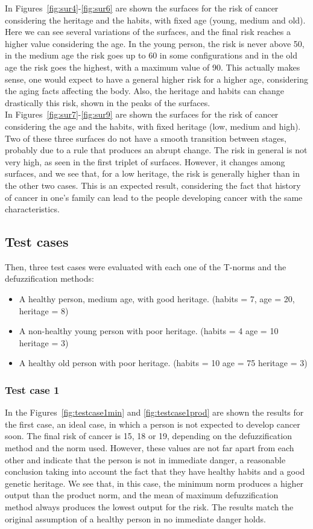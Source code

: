 \documentclass[conference]{IEEEtran}
\begin{document}
In Figures~\ref{fig:sur4}-\ref{fig:sur6} are shown the surfaces for the risk of cancer considering the heritage and the habits, with fixed age (young, medium and old). Here we can see several variations of the surfaces, and the final risk reaches a higher value considering the age. In the young person, the risk is never above 50, in the medium age the risk goes up to 60 in some configurations and in the old age the risk goes the highest, with a maximum value of 90. This actually makes sense, one would expect to have a general higher risk for a higher age, considering the aging facts affecting the body. Also, the heritage and habits can change drastically this risk, shown in the peaks of the surfaces.\\

In Figures~\ref{fig:sur7}-\ref{fig:sur9} are shown the surfaces for the risk of cancer considering the age and the habits, with fixed heritage (low, medium and high). Two of these three surfaces do not have a smooth transition between stages, probably due to a rule that produces an abrupt change. The risk in general is not very high, as seen in the first triplet of surfaces. However, it changes among surfaces, and we see that, for a low heritage, the risk is generally higher than in the other two cases. This is an expected result, considering the fact that history of cancer in one's family can lead to the people developing cancer with the same characteristics.

\subsection{Test cases}
Then, three test cases were evaluated with each one of the T-norms and the defuzzification methods:
\begin{itemize}
    \item A healthy person, medium age, with good heritage. (habits = 7, age = 20, heritage = 8)
    \item A non-healthy young person with poor heritage. (habits = 4 age = 10 heritage = 3)
    \item A healthy old person with poor heritage. (habits = 10 age = 75 heritage = 3)
\end{itemize}

\subsubsection{Test case 1}
In the Figures~\ref{fig:testcase1min} and \ref{fig:testcase1prod} are shown the results for the first case, an ideal case, in which a person is not expected to develop cancer soon. The final risk of cancer is 15, 18 or 19, depending on the defuzzification method and the norm used. However, these values are not far apart from each other and indicate that the person is not in immediate danger, a reasonable conclusion taking into account the fact that they have healthy habits and a good genetic heritage. We see that, in this case, the minimum norm produces a higher output than the product norm, and the mean of maximum defuzzification method always produces the lowest output for the risk. The results match the original assumption of a healthy person in no immediate danger holds.

\end{document}
